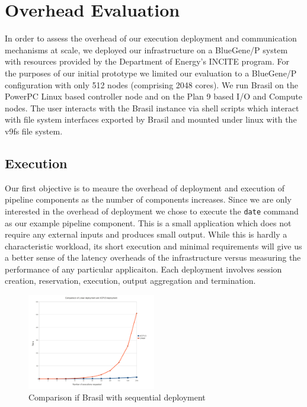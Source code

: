 \section{Overhead Evaluation}
In order to assess the overhead of our execution deployment and communication
mechanisms at scale, we deployed our infrastructure on a BlueGene/P system
with resources provided by the Department of Energy's INCITE program.
For the purposes of our initial prototype we limited our evaluation to a
BlueGene/P configuration with only 512 nodes (comprising 2048 cores).
We run Brasil on the PowerPC Linux based controller node and on
the Plan 9 based I/O and Compute nodes.
The user interacts with the Brasil instance via shell scripts which 
interact with file system interfaces exported by Brasil and mounted 
under linux with the v9fs file system.

\subsection{Execution}

Our first objective is to meaure the overhead of deployment and execution
of pipeline components as the number of components increases.  Since we 
are only interested in the overhead of deployment we chose to execute the
\texttt{date} command as our example pipeline component.
This is a small application which does not require any external inputs 
and produces small output. 
While this is hardly a characteristic workload, its short execution and
minimal requirements will give us a better sense of the latency overheads
of the infrastructure versus measuring the performance of any particular
applicaiton.
Each deployment involves
session creation, reservation, execution, output aggregation and termination.

\begin{figure}[h]
  \begin{center}
    \leavevmode
      \includegraphics[height=0.2\textheight,width=0.5\textwidth]
		{./img/linear}
    \caption{Comparison if Brasil with sequential deployment}
    \label{fig:sequential}
  \end{center}
\end{figure}

